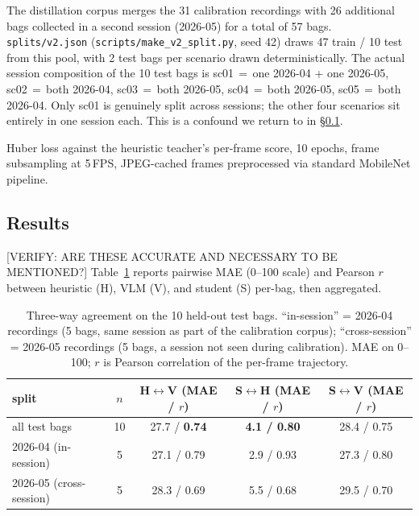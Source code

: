 \documentclass{article}
\newcommand{\code}[1]{\texttt{\small #1}}
\begin{document}
The distillation corpus merges the 31 calibration recordings with 26 additional bags collected in a second session (2026-05) for a total of 57 bags. \code{splits/v2.json} (\code{scripts/make\_v2\_split.py}, seed 42) draws 47 train / 10 test from this pool, with 2 test bags per scenario drawn deterministically. The actual session composition of the 10 test bags is sc01\,$=$\,one 2026-04 + one 2026-05, sc02\,$=$\,both 2026-04, sc03\,$=$\,both 2026-05, sc04\,$=$\,both 2026-05, sc05\,$=$\,both 2026-04. Only sc01 is genuinely split across sessions; the other four scenarios sit entirely in one session each. This is a confound we return to in \S\ref{sec:distill-results}.

Huber loss against the heuristic teacher's per-frame score, 10 epochs, frame subsampling at 5\,FPS, JPEG-cached frames preprocessed via standard MobileNet pipeline.

\subsection{Results}\label{sec:distill-results}

[VERIFY: ARE THESE ACCURATE AND NECESSARY TO BE MENTIONED?] Table~\ref{tab:distill} reports pairwise MAE (0--100 scale) and Pearson $r$ between heuristic (H), VLM (V), and student (S) per-bag, then aggregated.

\begin{table}[h]
\centering
\caption{Three-way agreement on the 10 held-out test bags. ``in-session'' = 2026-04 recordings (5 bags, same session as part of the calibration corpus); ``cross-session'' = 2026-05 recordings (5 bags, a session not seen during calibration). MAE on 0--100; $r$ is Pearson correlation of the per-frame trajectory.}
\label{tab:distill}
\small
\begin{tabular}{@{}lcccc@{}}
\toprule
split & $n$ & H$\leftrightarrow$V (MAE / $r$) & S$\leftrightarrow$H (MAE / $r$) & S$\leftrightarrow$V (MAE / $r$) \\
\midrule
all test bags          & 10 & 27.7 / \textbf{0.74} & \textbf{4.1 / 0.80} & 28.4 / 0.75 \\
2026-04 (in-session)   & 5  & 27.1 / 0.79          & 2.9 / 0.93          & 27.3 / 0.80 \\
2026-05 (cross-session)& 5  & 28.3 / 0.69          & 5.5 / 0.68          & 29.5 / 0.70 \\
\bottomrule
\end{tabular}
\end{table}
\end{document}
